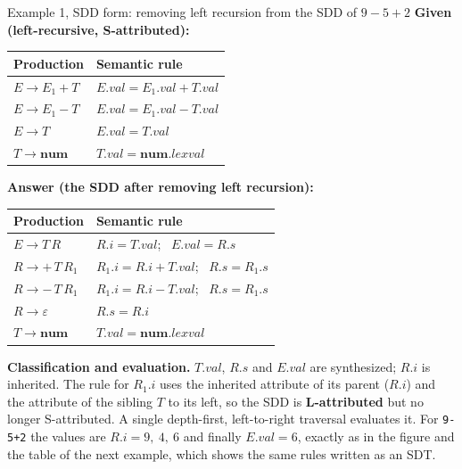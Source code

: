 \documentclass[11pt,a4paper]{article}
\newcommand{\at}[2]{\ensuremath{#1.\mathit{#2}}}
\begin{document}
\begin{examplebox}{Example 1, SDD form: removing left recursion from the SDD of $9-5+2$}
\textbf{Given (left-recursive, S-attributed):}
\begin{center}
\small
\begin{tabular}{@{}l l@{}}
\toprule
\textbf{Production} & \textbf{Semantic rule} \\ \midrule
$E \to E_1 + T$ & $\at{E}{val}=\at{E_1}{val}+\at{T}{val}$ \\
$E \to E_1 - T$ & $\at{E}{val}=\at{E_1}{val}-\at{T}{val}$ \\
$E \to T$       & $\at{E}{val}=\at{T}{val}$ \\
$T \to \mathbf{num}$ & $\at{T}{val}=\at{\mathbf{num}}{lexval}$ \\ \bottomrule
\end{tabular}
\end{center}
\textbf{Answer (the SDD after removing left recursion):}
\begin{center}
\small
\begin{tabular}{@{}l l@{}}
\toprule
\textbf{Production} & \textbf{Semantic rule} \\ \midrule
$E \to T\,R$        & $\at{R}{i}=\at{T}{val}$; \ $\at{E}{val}=\at{R}{s}$ \\
$R \to +\,T\,R_1$   & $\at{R_1}{i}=\at{R}{i}+\at{T}{val}$; \ $\at{R}{s}=\at{R_1}{s}$ \\
$R \to -\,T\,R_1$   & $\at{R_1}{i}=\at{R}{i}-\at{T}{val}$; \ $\at{R}{s}=\at{R_1}{s}$ \\
$R \to \varepsilon$ & $\at{R}{s}=\at{R}{i}$ \\
$T \to \mathbf{num}$ & $\at{T}{val}=\at{\mathbf{num}}{lexval}$ \\ \bottomrule
\end{tabular}
\end{center}
\textbf{Classification and evaluation.} $\at{T}{val}$, $\at{R}{s}$ and $\at{E}{val}$ are synthesized; $\at{R}{i}$ is inherited. The rule for $R_1.i$ uses the inherited attribute of its parent ($R.i$) and the attribute of the sibling $T$ to its left, so the SDD is \textbf{L-attributed} but no longer S-attributed. A single depth-first, left-to-right traversal evaluates it. For \texttt{9-5+2} the values are $R.i=9,\ 4,\ 6$ and finally $E.val=6$, exactly as in the figure and the table of the next example, which shows the same rules written as an SDT.


\end{examplebox}
\end{document}
